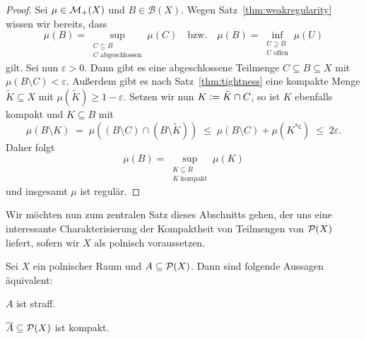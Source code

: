 \documentclass[../main/main.tex]{subfiles}
\begin{document}
	\begin{proof}
		Sei $\mu \in \mathcal{M}_{+}(X)$ und $B \in \mathcal{B}(X)$. 
		Wegen Satz~\ref{thm:weakregularity} wissen wir bereits, dass 
		\[\mu(B) = \sup_{\substack{C \subseteq B \\ C \text{ abgeschlossen}}} \mu(C) 
		\quad \text{bzw.} \quad \mu(B) = \inf_{\substack{U \supseteq B \\ U \text{ offen}}} 
		\mu(U)\]
		gilt. Sei nun $\varepsilon > 0$. Dann gibt es eine abgeschlossene Teilmenge 
		$C \subseteq B \subseteq X$ mit $\mu(B \setminus C) < \varepsilon$. 
		Außerdem gibt es nach Satz~\ref{thm:tightness} eine kompakte Menge 
		$\tilde{K} \subseteq X$ mit $\mu(\tilde{K}) \geq 1 - \varepsilon$. Setzen 
		wir nun $K \vcentcolon = \tilde{K} \cap C$, so ist $K$ ebenfalls kompakt und 
		$K \subseteq B$ mit 
		\[ \mu(B \setminus K) 
		\; = \; \mu((B \setminus C) \cap (B \setminus \tilde{K})) 
		\; \leq \; \mu(B \setminus C) + \mu(K^{\ast \mathsf{c}}) 
		\; \leq \; 2 \varepsilon \text{.} \]
		Daher folgt 
		\[\mu(B) 
		= \sup_{\substack{K \subseteq B \\ K \text{ kompakt}}} \mu(K)\] 
		und insgesamt $\mu$ ist regulär.
	\end{proof}

	Wir möchten nun zum zentralen Satz dieses Abschnitts gehen, der uns eine interessante Charakterisierung der Kompaktheit von Teilmengen von $\mathcal{P}(X)$ liefert, sofern wir $X$ als polnisch voraussetzen.
	
	\begin{Satz}[Prokhorov]
		\label{thm:prokhorov}
		Sei $X$ ein polnischer Raum und $A \subseteq \mathcal{P}(X)$. Dann sind folgende Aussagen äquivalent:
		\begin{equivalentthm}
			\item $A$ ist straff.
			\item $\overline{A} \subseteq \mathcal{P}(X)$ ist kompakt.
		\end{equivalentthm}
	\end{Satz}
	
\end{document}
